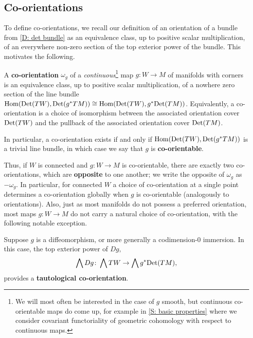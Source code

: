\subsection{Co-orientations}\label{S: co-orientations}

To define co-orientations, we recall our definition of an orientation of a bundle from \cref{D: det bundle} as an equivalence class, up to positive scalar multiplication, of an everywhere non-zero section of the top exterior power of the bundle.
This motivates the following.

\begin{definition}\label{D: co-orientations}
	A \textbf{co-orientation} $\omega_g$ of a \textit{continuous}\footnote{We will most often be interested in the case of $g$ smooth, but continuous co-orientable maps do come up, for example in \cref{S: basic properties} where we consider covariant functoriality of geometric cohomology with respect to continuous maps.} map $g \colon W \to M$ of manifolds with corners is an equivalence class, up to positive scalar multiplication, of a nowhere zero section of the line bundle $\textup{Hom}({\rm Det}(TW), {\rm Det}(g^*TM)) \cong \textup{Hom}({\rm Det}(TW), g^*{\rm Det}(TM))$.
	Equivalently, a co-orientation is a choice of isomorphism between the associated orientation cover ${\rm Det}(TW)$ and the pullback of the associated orientation cover ${\rm Det}(TM)$.

	In particular, a co-orientation exists if and only if $\textup{Hom}({\rm Det}(TW), {\rm Det}(g^*TM))$ is a trivial line bundle, in which case we say that $g$ is \textbf{co-orientable}.
\end{definition}

Thus, if $W$ is connected and $g \colon W \to M$ is co-orientable, there are exactly two co-orientations, which are \textbf{opposite} to one another; we write the opposite of $\omega_g$ as $-\omega_g$.
In particular, for connected $W$ a choice of co-orientation at a single point determines a co-orientation globally when $g$ is co-orientable (analogously to orientations).
Also, just as most manifolds do not possess a preferred orientation, most maps $g \colon W \to M$ do not carry a natural choice of co-orientation, with the following notable exception. 

\begin{definition}\label{D: tautological co-orientation}
	 Suppose $g$ is a diffeomorphism, or more generally a codimension-0 immersion. In this case, the top exterior power of $Dg$, 
	$$\bigwedge Dg \colon \bigwedge TW \to \bigwedge g^*{\rm Det}(TM),$$ 
	provides a \textbf{tautological co-orientation}.
\end{definition}

